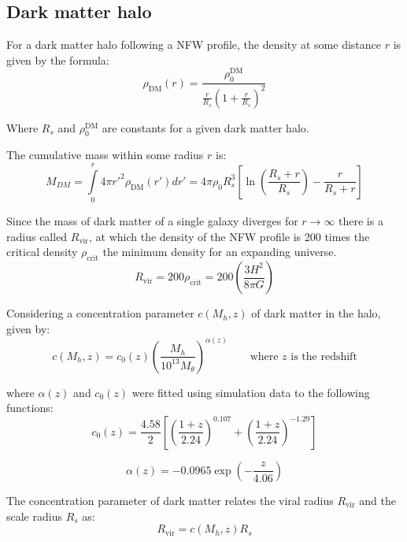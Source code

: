 	\subsection{Dark matter halo}
		For a dark matter halo following a NFW profile, the density at some distance $r$ is given by the formula:
		\begin{equation}
			\rho_\text{DM}(r) = \dfrac{\rho_0^\text{DM}}{\frac{r}{R_s}\left(1 + \frac{r}{R_s}\right)^2}
		\end{equation}
		
		Where $R_s$ and $\rho_0^\text{DM}$ are constants for a given dark matter halo.
		
		The cumulative mass within some radius $r$ is:
		\begin{equation}
			M_{DM} = \int\limits_0^{r} 4\pi {r'}^2\rho_\text{DM}(r')dr' = 4\pi\rho_0R_s^3\left[\ln\left(\dfrac{R_s + r}{R_s}\right) - \dfrac{r}{R_s + r}\right]
		\end{equation}
		
		Since the mass of dark matter of a single galaxy diverges for $r \rightarrow \infty$ there is a radius called $R_\text{vir}$, at which the density of the NFW profile is 200 times the critical density $\rho_\text{crit}$ the minimum density for an expanding universe.
		\begin{equation}
			R_\text{vir} = 200 \rho_\text{crit} = 200 \left(\dfrac{3H^2}{8\pi G}\right)
		\end{equation}
		
		Considering a concentration parameter $c(M_h, z)$ of dark matter in the halo, given by:
		\begin{equation}
			c(M_h, z) = c_0(z)\left(\dfrac{M_h}{10^{13}M_\theta}\right)^{\alpha(z)} \qquad \text{where $z$ is the redshift}
		\end{equation}
		
		where $\alpha(z)$ and $c_0(z)$ were fitted using simulation data to the following functions:
		\begin{equation}
			c_0(z) = \dfrac{4.58}{2}\left[\left(\dfrac{1 + z}{2.24}\right)^{0.107} + \left(\dfrac{1 + z}{2.24}\right)^{-1.29}\right]
		\end{equation}
		
		\begin{equation}
			\alpha(z) = -0.0965 \exp\left(-\dfrac{z}{4.06}\right)
		\end{equation}
		
		The concentration parameter of dark matter relates the viral radius $R_\text{vir}$ and the scale radius $R_s$ as:
		\begin{equation}
			R_\text{vir} = c(M_h, z)R_s
		\end{equation}
		
